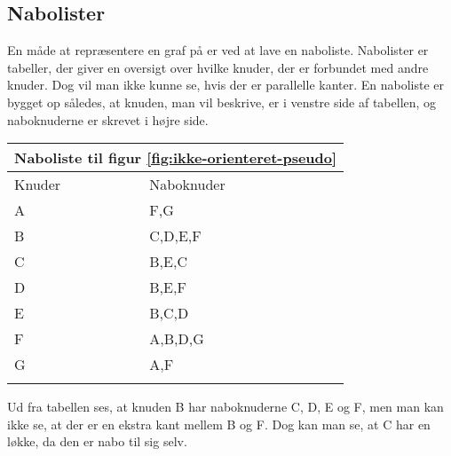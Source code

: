 \subsection{Nabolister}
En måde at repræsentere en graf på er ved at lave en naboliste. Nabolister er tabeller, der giver en oversigt over hvilke knuder, der er forbundet med andre knuder. Dog vil man ikke kunne se, hvis der er parallelle kanter. En naboliste er bygget op således, at knuden, man vil beskrive, er i venstre side af tabellen, og naboknuderne er skrevet i højre side. \\

%

\begin{center}
	\begin{tabular}{ |p{4cm}||p{3cm}|}
	 	\hline
 		\multicolumn{2}{|c|}{Naboliste til figur \ref{fig:ikke-orienteret-pseudo}} \\
 		\hline
 		Knuder & Naboknuder\\
 		\hline
 		A & F,G \\
		B & C,D,E,F \\
		C & B,E,C \\
		D & B,E,F \\
		E & B,C,D \\
		F & A,B,D,G \\
		G & A,F \\
 	\hline
 	\label{tab:naboliste} 	
	\end{tabular}
\end{center}
Ud fra tabellen ses, at knuden B har naboknuderne C, D, E og F, men man kan ikke se, at der er en ekstra kant mellem B og F. Dog kan man se, at C har en løkke, da den er nabo til sig selv.

